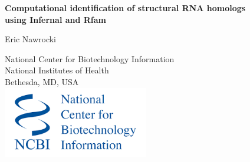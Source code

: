 \documentclass[landscape]{slides}
\begin{document}
\begin{slide}
\begin{center}
\large{\textbf{Computational identification of structural RNA homologs \\
using Infernal and Rfam}}

\normalsize

Eric Nawrocki

National Center for Biotechnology Information\\
National Institutes of Health\\
Bethesda, MD, USA\\

\vspace{1in}
\includegraphics[width=2.5in]{figs/ncbi-logo}


\medskip

\medskip

\small



\end{center}
\end{slide}
\end{document}
